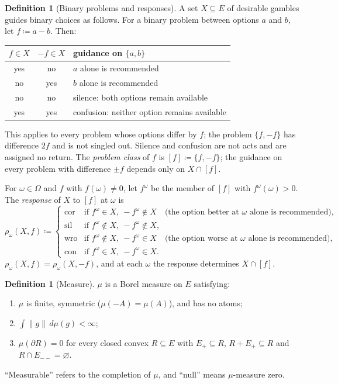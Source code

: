 \documentclass[11pt]{article}
\theoremstyle{definition}
\newtheorem{definition}[theorem]{Definition}
\theoremstyle{remark}
\newcommand{\bd}{\partial}
\newcommand{\cor}{\mathrm{cor}}
\newcommand{\sil}{\mathrm{sil}}
\newcommand{\wro}{\mathrm{wro}}
\newcommand{\con}{\mathrm{con}}
\begin{document}
\begin{definition}[Binary problems and responses]\label{def:responses}
A set $X\subseteq E$ of desirable gambles guides binary choices as follows. For a binary problem between options $a$ and $b$, let $f\coloneqq a-b$. Then:
\begin{center}
\begin{tabular}{cc|l}
$f\in X$ & $-f\in X$ & guidance on $\{a,b\}$\\\hline
yes & no & $a$ alone is recommended\\
no & yes & $b$ alone is recommended\\
no & no & silence: both options remain available\\
yes & yes & confusion: neither option remains available
\end{tabular}
\end{center}
This applies to every problem whose options differ by $f$; the problem $\{f,-f\}$ has difference $2f$ and is not singled out. Silence and confusion are not acts and are assigned no return. The \emph{problem class} of $f$ is $[f]\coloneqq\{f,-f\}$; the guidance on every problem with difference $\pm f$ depends only on $X\cap[f]$.

For $\omega\in\Omega$ and $f$ with $f(\omega)\ne0$, let $f^\omega$ be the member of $[f]$ with $f^\omega(\omega)>0$. The \emph{response} of $X$ to $[f]$ at $\omega$ is
\[
\rho_\omega(X,f)\coloneqq
\begin{cases}
\cor&\text{if }f^\omega\in X,\ -f^\omega\notin X\quad\text{(the option better at $\omega$ alone is recommended)},\\
\sil&\text{if }f^\omega\notin X,\ -f^\omega\notin X,\\
\wro&\text{if }f^\omega\notin X,\ -f^\omega\in X\quad\text{(the option worse at $\omega$ alone is recommended)},\\
\con&\text{if }f^\omega\in X,\ -f^\omega\in X.
\end{cases}
\]
$\rho_\omega(X,f)=\rho_\omega(X,-f)$, and at each $\omega$ the response determines $X\cap[f]$.
\end{definition}

\begin{definition}[Measure]\label{def:measure}
$\mu$ is a Borel measure on $E$ satisfying:
\begin{enumerate}[label=(M\arabic*)]
\item $\mu$ is finite, symmetric ($\mu(-A)=\mu(A)$), and has no atoms;
\item $\int\|g\|\,d\mu(g)<\infty$;
\item $\mu(\bd R)=0$ for every closed convex $R\subseteq E$ with $E_+\subseteq R$, $R+E_+\subseteq R$ and $R\cap E_{--}=\varnothing$.
\end{enumerate}
``Measurable'' refers to the completion of $\mu$, and ``null'' means $\mu$-measure zero.
\end{definition}
\end{document}
